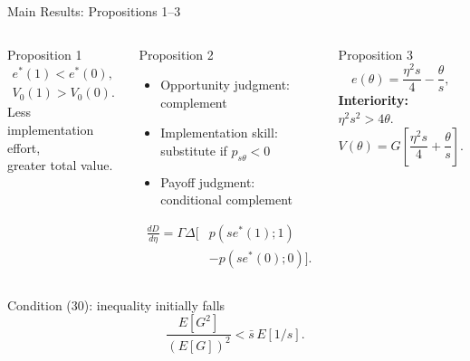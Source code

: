 \documentclass[aspectratio=169,11pt]{beamer}
\begin{document}
\begin{frame}{Main Results: Propositions 1--3}
  \small
  \begin{columns}[T,onlytextwidth]
      \begin{block}{Proposition 1}
        \[
          \begin{gathered}
            e^*(1)<e^*(0),\\[-0.2em]
            V_0(1)>V_0(0).
          \end{gathered}
        \]
        Less implementation effort,\\ greater total value.
      \end{block}

      \begin{block}{Proposition 2}
        \begin{itemize}
          \setlength\itemsep{0.15em}
          \item Opportunity judgment: complement
          \item Implementation skill: substitute if $p_{s\theta}<0$
          \item Payoff judgment: conditional complement
        \end{itemize}
        \vspace{-0.25em}
        \[
          \begin{aligned}
          \frac{dD}{d\eta}=\Gamma\Delta\bigl[&p(se^*(1);1)\\[-0.15em]
                                               &-p(se^*(0);0)\bigr].
          \end{aligned}
        \]
      \end{block}

      \begin{block}{Proposition 3}
        \[
          e(\theta)=\frac{\eta^2s}{4}-\frac{\theta}{s},
        \]
        \vspace{-0.65em}
        \textbf{Interiority:} $\eta^2s^2>4\theta$.
        \vspace{-0.35em}
        \[
          V(\theta)=G\left[\frac{\eta^2s}{4}+\frac{\theta}{s}\right].
        \]
      \end{block}
  \end{columns}

  \vspace{-0.55em}
  \begin{alertblock}{Condition (30): inequality initially falls}
    \vspace{-0.45em}
    \[
      \frac{E[G^2]}{(E[G])^2}<\bar{s}\,E[1/s].
    \]
  \end{alertblock}
\end{frame}
\end{document}
